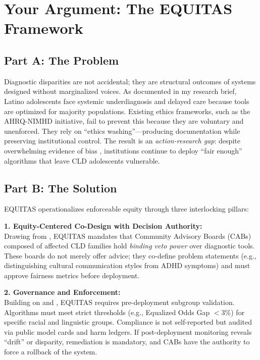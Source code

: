 \documentclass[12pt, letterpaper]{article}
\begin{document}
\section{Your Argument: The EQUITAS Framework}

\subsection{Part A: The Problem}
Diagnostic disparities are not accidental; they are structural outcomes of systems designed without marginalized voices. As documented in my research brief, Latino adolescents face systemic underdiagnosis and delayed care because tools are optimized for majority populations. Existing ethics frameworks, such as the AHRQ-NIMHD initiative, fail to prevent this because they are voluntary and unenforced. They rely on ``ethics washing''—producing documentation while preserving institutional control. The result is an \textit{action-research gap}: despite overwhelming evidence of bias \citep{marko2025}, institutions continue to deploy ``fair enough'' algorithms that leave CLD adolescents vulnerable.

\subsection{Part B: The Solution}
EQUITAS operationalizes enforceable equity through three interlocking pillars:

\textbf{1. Equity-Centered Co-Design with Decision Authority:} \\
Drawing from \cite{nadarzynski2024}, EQUITAS mandates that Community Advisory Boards (CABs) composed of affected CLD families hold \textit{binding veto power} over diagnostic tools. These boards do not merely offer advice; they co-define problem statements (e.g., distinguishing cultural communication styles from ADHD symptoms) and must approve fairness metrics before deployment.

\textbf{2. Governance and Enforcement:} \\
Building on \cite{lekadir2025} and \cite{chen2023}, EQUITAS requires pre-deployment subgroup validation. Algorithms must meet strict thresholds (e.g., Equalized Odds Gap $<3\%$) for specific racial and linguistic groups. Compliance is not self-reported but audited via public model cards and harm ledgers. If post-deployment monitoring reveals ``drift'' or disparity, remediation is mandatory, and CABs have the authority to force a rollback of the system.
\end{document}
